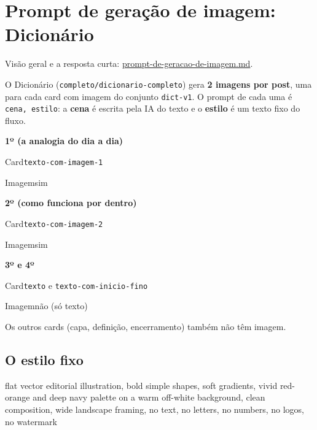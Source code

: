 
\section{Prompt de geração de imagem: Dicionário}\label{sec:dicionario}

Visão geral e a resposta curta: \hyperref[sec:visao-geral]{prompt-de-geracao-de-imagem.md}.

O Dicionário (\nolinkurl{completo/dicionario-completo}) gera \textbf{2 imagens por post}, uma para cada card com imagem do conjunto \nolinkurl{dict-v1}. O prompt de cada uma é \texttt{cena, estilo}: a \textbf{cena} é escrita pela IA do texto e o \textbf{estilo} é um texto fixo do fluxo.

\begin{recordbox}
{\bfseries\color{accent} 1º (a analogia do dia a dia)}\par
{\small\color{muted} Card}\quad \nolinkurl{texto-com-imagem-1}\par
{\small\color{muted} Imagem}\quad sim\par
\end{recordbox}
\begin{recordbox}
{\bfseries\color{accent} 2º (como funciona por dentro)}\par
{\small\color{muted} Card}\quad \nolinkurl{texto-com-imagem-2}\par
{\small\color{muted} Imagem}\quad sim\par
\end{recordbox}
\begin{recordbox}
{\bfseries\color{accent} 3º e 4º}\par
{\small\color{muted} Card}\quad \texttt{texto} e \nolinkurl{texto-com-inicio-fino}\par
{\small\color{muted} Imagem}\quad não (só texto)\par
\end{recordbox}


Os outros cards (capa, definição, encerramento) também não têm imagem.

\subsection*{O estilo fixo}

\begin{sourcequote}
flat vector editorial illustration, bold simple shapes, soft gradients, vivid red-orange and deep navy palette on a warm off-white background, clean composition, wide landscape framing, no text, no letters, no numbers, no logos, no watermark

\end{sourcequote}


